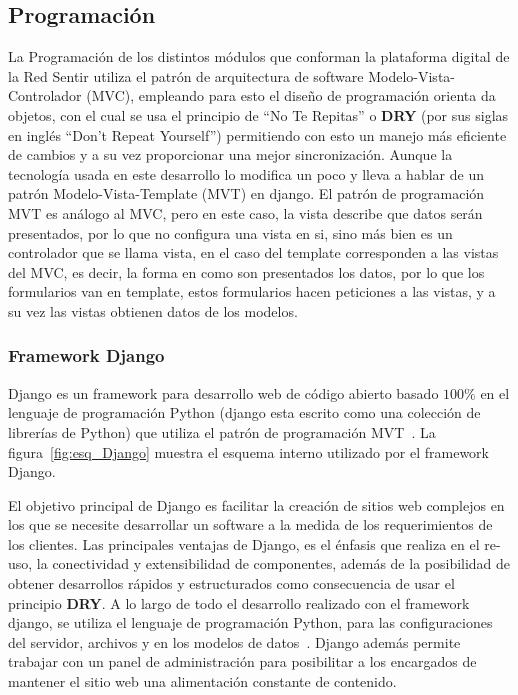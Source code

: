 \documentclass[journal,transmag]{IEEEtran}
\begin{document}
\subsection{Programación}
La Programación de los distintos módulos que conforman la plataforma digital de la Red Sentir utiliza el patrón de arquitectura de software Modelo-Vista-Controlador (MVC), empleando para esto el diseño de programación orienta da objetos, con el cual se usa el principio de ``No Te Repitas'' o \textbf{DRY} (por sus siglas en inglés ``Don't Repeat Yourself'') permitiendo con esto un manejo más eficiente de cambios y a su vez proporcionar una mejor sincronización. Aunque la tecnología usada en este desarrollo lo modifica un poco y lleva a hablar de un patrón Modelo-Vista-Template (MVT) en django. El patrón de programación MVT es análogo al MVC, pero en este caso, la vista describe que datos serán presentados, por lo que no configura una vista en si, sino más bien es un controlador que se llama vista, en el caso del template corresponden a las vistas del MVC, es decir, la forma en como son presentados los datos, por lo que los formularios van en template, estos formularios hacen peticiones a las vistas, y a su vez las vistas obtienen datos de los modelos.

\subsubsection{Framework Django}
Django es un framework para desarrollo web de código abierto basado $100\%$ en el lenguaje de programación Python (django esta escrito como una colección de librerías de Python) que utiliza el patrón de programación MVT~\cite{Hol2009, DjangoM}. La figura~\ref{fig:esq_Django} muestra el esquema interno utilizado por el framework Django.

El objetivo principal de Django es facilitar la creación de sitios web complejos en los que se necesite desarrollar un software a la medida de los requerimientos de los clientes. Las principales ventajas de Django, es el énfasis que realiza en el re-uso, la conectividad y extensibilidad de componentes, además de la posibilidad de obtener desarrollos rápidos y estructurados como consecuencia de usar el principio \textbf{DRY}. A lo largo de todo el desarrollo realizado con el framework django, se utiliza el lenguaje de programación Python, para las configuraciones del servidor, archivos y en los modelos de datos~\cite{Wik2014}. Django además permite trabajar con un panel de administración para posibilitar a los encargados de mantener el sitio web una alimentación constante de contenido.
\end{document}
